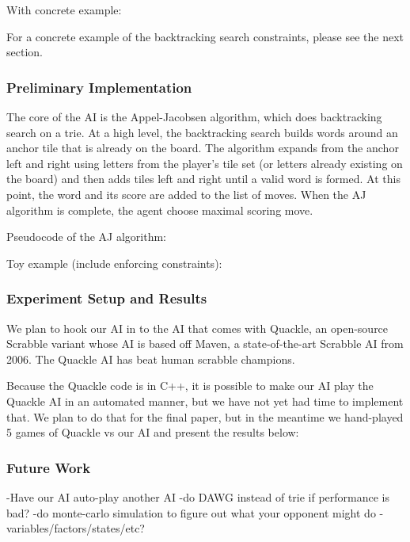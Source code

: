 \documentclass[12pt]{article}
\begin{document}
With concrete example:

For a concrete example of the backtracking search constraints, please
see the next section.

\subsubsection*{Preliminary Implementation}
The core of the AI is the Appel-Jacobsen algorithm, which does
backtracking search on a trie. At a high level, the backtracking
search builds words around an anchor tile that is already on the
board. The algorithm expands from the anchor left and right using
letters from the player's tile set (or letters already existing on the
board) and then adds tiles left and right until a valid word is
formed. At this point, the word and its score are added to the
list of moves. When the AJ algorithm is complete, the agent choose maximal
scoring move.

Pseudocode of the AJ algorithm:


Toy example (include enforcing constraints):


\subsubsection*{Experiment Setup and Results}
We plan to hook our AI in to the AI that comes with Quackle, an
open-source Scrabble variant whose AI is based off Maven, a
state-of-the-art Scrabble AI from 2006. The Quackle AI has beat human
scrabble champions.

Because the Quackle code is in C++, it is possible to make our AI play
the Quackle AI in an automated manner, but we have not yet had time to
implement that. We plan to do that for the final paper, but in the
meantime we hand-played 5 games of Quackle vs our AI and present the
results below:

\subsubsection*{Future Work}
-Have our AI auto-play another AI
-do DAWG instead of trie if performance is bad?
-do monte-carlo simulation to figure out what your opponent might do
-variables/factors/states/etc?
\end{document}
